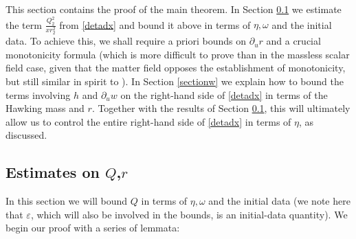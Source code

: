 \documentclass{article}[11pt]
\newcommand{\hsp}{\hspace{.5mm}}
\newcommand{\hba}{\underline{h}}
\numberwithin{equation}{section}
\begin{document}




This section contains the proof of the main theorem. In Section \ref{sectionQ} we estimate the term $\frac{Q_2^2}{xr_2^2}$ from \eqref{detadx} and bound it above in terms of $\eta, \omega$ and the initial data. To achieve this, we shall require a priori bounds on $\partial_u r$ and a crucial monotonicity formula (which is more difficult to prove than in the massless scalar field case, given that the matter field opposes the establishment of monotonicity, but still similar in spirit to \cite{AnLim}). In Section \ref{sectionw} we explain how to bound the terms involving $h$ and $\partial_u w$ on the right-hand side of \eqref{detadx} in terms of the Hawking mass and $r$. Together with the results of Section \ref{sectionQ}, this will ultimately allow us to control the entire right-hand side of \eqref{detadx} in terms of $\eta$, as discussed. 

\subsection{Estimates on $Q$,$r$} \label{sectionQ} In this section we will bound $Q$ in terms of $\eta, \omega$ and the initial data (we note here that $\varepsilon$, which will also be involved in the bounds, is an initial-data quantity). \noindent We begin our proof with a series of lemmata:
\end{document}
